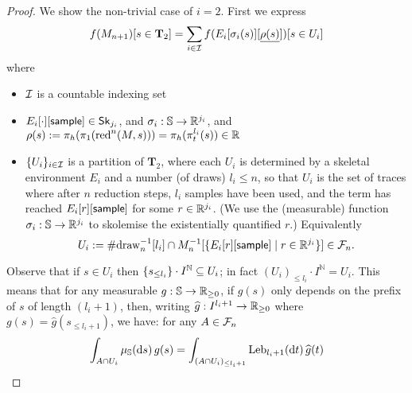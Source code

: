 \begin{proof}
We show the non-trivial case of $i = 2$.
First we express 
\begin{equation}
f(M_{n+1})[s \in \mathbf{T}_2] = \sum_{i \in \mathcal{I}} 
f(E_i[\sigma_i(s)][\underline{\rho(s)}])[s \in U_i]
\label{eqn:f 2 n+1}
\end{equation}
where 
\begin{itemize}
\item $\mathcal{I}$ is a countable indexing set
\item $E_i[\cdot][\mathsf{sample}] \in \mathsf{Sk}_{j_i}$, and $\sigma_i : {\mathbb{S}} \to \mathbb{R}^{j_i}$, and $\rho(s) := \pi_h(\pi_1(\operatorname{red}^n(M, s))) = \pi_h(\pi_t^{l_i}(s)) \in \mathbb{R}$ 
\item $\{{U_i}\}_{i \in \mathcal{I}}$ is a partition of $\mathbf{T}_2$, 
where each $U_i$ is determined by a skeletal environment $E_i$ and a number (of draws) $l_i \leq n$, so that $U_i$ is the set of traces where after $n$ reduction steps, $l_i$ samples have been used, and the term has reached $E_i[r][\mathsf{sample}]$ for some $r \in \mathbb{R}^{j_i}$.
(We use the (measurable) function $\sigma_i : {\mathbb{S}} \to \mathbb{R}^{j_i}$ to skolemise the existentially quantified $r$.)
Equivalently
\[
U_i := \#\mathrm{draw}_n^{-1}[l_i] \cap M_n^{-1}[\{E_i[r][\mathsf{sample}] \mid r \in \mathbb{R}^{j_i}\}] \in \mathcal{F}_n.
\]
\end{itemize}

Observe that if $s \in U_i$ then $\{{s_{\leq l_i}}\} \cdot I^{\mathbb N} \subseteq U_i$;
in fact $(U_i)_{\leq l_i} \cdot I^{\mathbb N} = U_i$.
This means that for any measurable $g : {\mathbb{S}} \to \mathbb{R}_{\geq 0}$, if $g(s)$ only depends on the prefix of $s$ of length $(l_i+1)$, then, writing $\widehat{g} : I^{l_i+1} \to \mathbb{R}_{\geq 0}$ where $g(s) = \widehat{g}(s_{\leq l_i+1})$, we have: for any $A \in \mathcal{F}_n$ 
\begin{equation}
\int_{A \cap U_i}  \mu_{{\mathbb{S}}}(\mathrm{d} s) \, g(s) = 
\int_{(A \cap U_i)_{\leq l_i+1}} \mathrm{Leb}_{l_i+1}(\mathrm{d} t) \, \widehat{g}(t)
\label{eqn:truncate}
\end{equation}


\end{proof}
